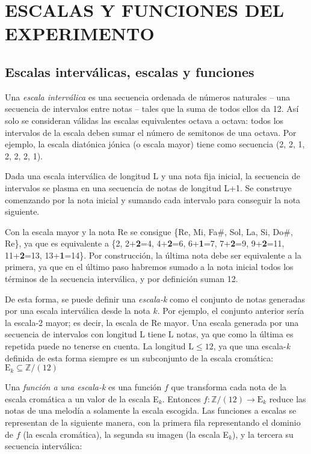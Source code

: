 \chapter{ESCALAS Y FUNCIONES DEL EXPERIMENTO}\label{ch:escalas}	
	\section{Escalas interválicas, escalas y funciones}
	
		Una \textit{escala interválica} es una secuencia ordenada de números naturales -- una secuencia de intervalos entre notas -- tales que la suma de todos ellos da 12. Así solo se consideran válidas las escalas equivalentes octava a octava: todos los intervalos de la escala deben sumar el número de semitonos de una octava. Por ejemplo, la escala diatónica jónica (o escala mayor) tiene como secuencia (2, 2, 1, 2, 2, 2, 1).
		
		Dada una escala interválica de longitud L y una nota fija inicial, la secuencia de intervalos se plasma en una secuencia de notas de longitud L+1. Se construye comenzando por la nota inicial y sumando cada intervalo para conseguir la nota siguiente. 
		
		Con la escala mayor y la nota Re se consigue \{Re, Mi, Fa$\#$, Sol, La, Si, Do$\#$, Re\}, ya que es equivalente a \{2, 2+\textbf{2}=4, 4+\textbf{2}=6, 6+\textbf{1}=7, 7+\textbf{2}=9, 9+\textbf{2}=11, 11+\textbf{2}=13, 13+\textbf{1}=14\}. Por construcción, la última nota debe ser equivalente a la primera, ya que en el último paso habremos sumado a la nota inicial todos los términos de la secuencia interválica, y por definición suman 12.
		
		De esta forma, se puede definir una \textit{escala-k} como el conjunto de notas generadas por una escala interválica desde la nota $k$. Por ejemplo, el conjunto anterior sería la escala-2 mayor; es decir, la escala de Re mayor. Una escala generada por una secuencia de intervalos con longitud L tiene L notas, ya que como la última es repetida puede no tenerse en cuenta. La longitud $\text{L}\leq 12$, ya que una escala-\textit{k} definida de esta forma siempre es un subconjunto de la escala cromática: $\text{E}_k\subseteq\mathbb{Z}/(12)$
		
		Una \textit{función a una escala-k} es una función $f$ que transforma cada nota de la escala cromática a un valor de la escala E$_k$. Entonces $f : \mathbb{Z}/(12) \rightarrow \text{E}_k$ reduce las notas de una melodía a solamente la escala escogida. Las funciones a escalas se representan de la siguiente manera, con la primera fila representando el dominio de $f$ (la escala cromática), la segunda su imagen (la escala E$_k$), y la tercera su secuencia interválica:
		
